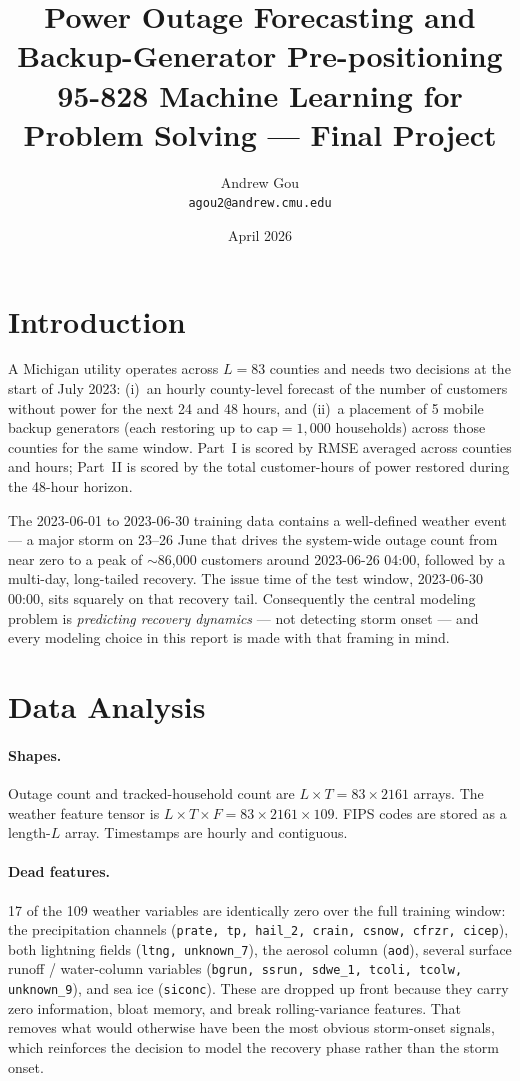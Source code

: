 \documentclass[11pt]{article}
\title{\vspace{-2em}Power Outage Forecasting and Backup-Generator Pre-positioning \\
       \large 95-828 Machine Learning for Problem Solving --- Final Project}
\author{Andrew Gou \\ \texttt{agou2@andrew.cmu.edu}}
\date{April 2026}
\begin{document}
\maketitle
\vspace{-1.4em}

\section{Introduction}

A Michigan utility operates across $L{=}83$ counties and needs two decisions
at the start of July 2023: (i)~an hourly county-level forecast of the number
of customers without power for the next 24 and 48 hours, and (ii)~a
placement of 5 mobile backup generators (each restoring up to
$\mathrm{cap}{=}1{,}000$ households) across those counties for the same
window. Part~I is scored by RMSE averaged across counties and hours;
Part~II is scored by the total customer-hours of power restored during the
48-hour horizon.

The 2023-06-01 to 2023-06-30 training data contains a well-defined weather
event --- a major storm on 23--26 June that drives the system-wide outage
count from near zero to a peak of $\sim$86{,}000 customers around 2023-06-26
04:00, followed by a multi-day, long-tailed recovery. The issue time of the
test window, 2023-06-30 00:00, sits squarely on that recovery tail.
Consequently the central modeling problem is \emph{predicting recovery
dynamics} --- not detecting storm onset --- and every modeling choice in
this report is made with that framing in mind.

\section{Data Analysis}

\paragraph{Shapes.} Outage count and tracked-household count are
$L{\times}T{=}83{\times}2161$ arrays. The weather feature tensor is
$L{\times}T{\times}F{=}83{\times}2161{\times}109$. FIPS codes are stored as
a length-$L$ array. Timestamps are hourly and contiguous.

\paragraph{Dead features.} 17 of the 109 weather variables are identically
zero over the full training window: the precipitation channels
(\texttt{prate, tp, hail\_2, crain, csnow, cfrzr, cicep}), both lightning
fields (\texttt{ltng, unknown\_7}), the aerosol column (\texttt{aod}), several
surface runoff / water-column variables
(\texttt{bgrun, ssrun, sdwe\_1, tcoli, tcolw, unknown\_9}), and sea ice
(\texttt{siconc}). These are dropped up front because they carry zero
information, bloat memory, and break rolling-variance features. That
removes what would otherwise have been the most obvious storm-onset
signals, which reinforces the decision to model the recovery phase rather
than the storm onset.
\end{document}
